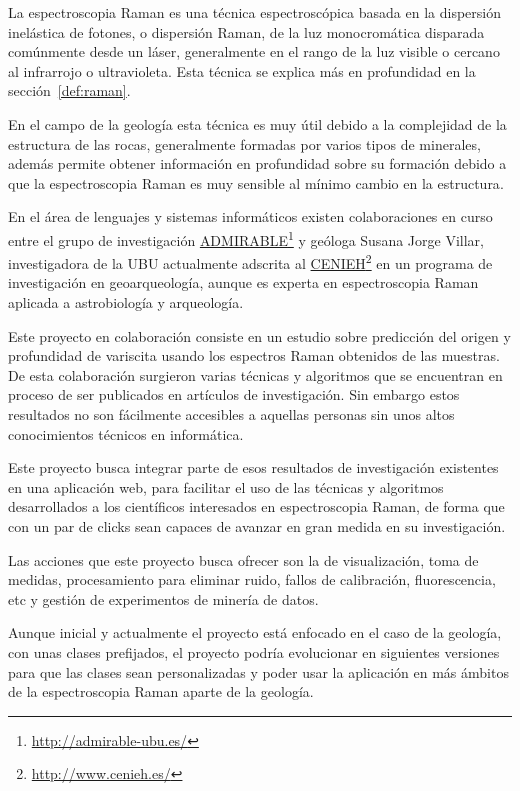 
La espectroscopia Raman es una técnica espectroscópica basada en la dispersión
inelástica de fotones, o dispersión Raman, de la luz monocromática disparada
comúnmente desde un láser\cite{raman-basics}, generalmente en el rango de la luz
visible o cercano al infrarrojo o ultravioleta\cite{wiki:raman-en}. Esta técnica
se explica más en profundidad en la sección~\ref{def:raman}.

En el campo de la geología esta técnica es muy útil debido a la complejidad de
la estructura de las rocas, generalmente formadas por varios tipos de minerales,
además permite obtener información en profundidad sobre su formación debido a
que la espectroscopia Raman es muy sensible al mínimo cambio en la
estructura\cite{quora:raman-geology}.

En el área de lenguajes y sistemas informáticos existen colaboraciones en curso
entre el grupo de investigación
\href{http://admirable-ubu.es/}{ADMIRABLE}\footnote{\url{http://admirable-ubu.es/}}
y geóloga Susana Jorge Villar, investigadora de la UBU actualmente adscrita al
\href{http://www.cenieh.es/}{CENIEH}\footnote{\url{http://www.cenieh.es/}} en un
programa de investigación en geoarqueología\cite{susana-cenieh}, aunque es
experta en espectroscopia Raman aplicada a astrobiología y
arqueología\cite{susana-ubu}.

Este proyecto en colaboración consiste en un estudio sobre predicción del origen
y profundidad de variscita usando los espectros Raman obtenidos de las muestras.
De esta colaboración surgieron varias técnicas y algoritmos que se encuentran en
proceso de ser publicados en artículos de investigación. Sin embargo estos
resultados no son fácilmente accesibles a aquellas personas sin unos altos
conocimientos técnicos en informática.

Este proyecto busca integrar parte de esos resultados de investigación
existentes en una aplicación web, para facilitar el uso de las técnicas y
algoritmos desarrollados a los científicos interesados en espectroscopia Raman,
de forma que con un par de clicks sean capaces de avanzar en gran medida en su
investigación.

Las acciones que este proyecto busca ofrecer son la de visualización, toma de
medidas, procesamiento para eliminar ruido, fallos de calibración,
fluorescencia, etc y gestión de experimentos de minería de datos.

Aunque inicial y actualmente el proyecto está enfocado en el caso de la
geología, con unas clases prefijados, el proyecto podría evolucionar en
siguientes versiones para que las clases sean personalizadas y poder usar la
aplicación en más ámbitos de la espectroscopia Raman aparte de la geología.


